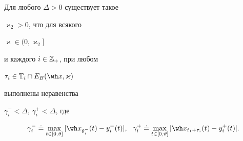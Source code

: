 \begin{lems}


Для любого $\Delta>0$ существует такое


$\varkappa_2>0$, что для всякого


$\varkappa\in(0,\varkappa_2]$


и каждого $i\in\Bbb Z_+$, при любом


$\tau_i\in\bT_i\cap E_B(\wh x,\varkappa)$


выполнены неравенства 


$\gamma_i^-<\Delta$, $\gamma_i^+<\Delta$, где


\begin{equation}


\gamma_i^-\doteq\max_{t\in[0,\vartheta]}|\wh


x_{\theta_i^-}(t)-y_i^-(t)|,\ \ \gamma


_i^+\doteq\max_{t\in[0,\vartheta]}|\wh


x_{t_1+\tau_i}(t)-y_i^+(t)|.


\end{equation}


\end{lems}





